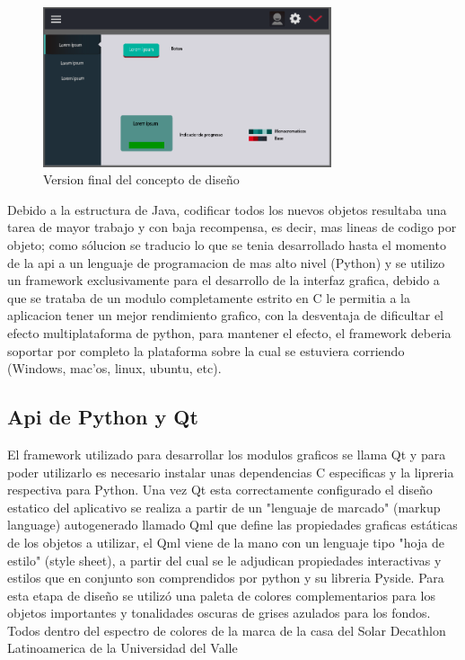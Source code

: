 \begin{figure}[htbp]
	\centerline{\includegraphics[width=8.5cm]{./figuras/house_manager_version_3.png}}
	\caption{Version final del concepto de diseño}
	\label{fig_22}
\end{figure}

Debido a la estructura de Java, codificar todos los nuevos objetos resultaba una tarea de mayor trabajo y con baja recompensa, es decir, mas lineas de codigo por objeto; como sólucion se traducio lo que se tenia desarrollado hasta el momento de la api a un lenguaje de programacion de mas alto nivel (Python) y se utilizo un framework exclusivamente para el desarrollo de la interfaz grafica, debido a que se trataba de un modulo completamente estrito en C le permitia a la aplicacion tener un mejor rendimiento grafico, con la desventaja de dificultar el efecto multiplataforma de python, para mantener el efecto, el framework deberia soportar por completo la plataforma sobre la cual se estuviera corriendo (Windows, mac'os, linux, ubuntu, etc).

\subsection{Api de Python y Qt}

El framework utilizado para desarrollar los modulos graficos se llama Qt y para poder utilizarlo es necesario instalar unas dependencias C especificas y la lipreria respectiva para Python. Una vez Qt esta correctamente configurado el diseño estatico del aplicativo se realiza a partir de un "lenguaje de marcado" (markup language) autogenerado llamado Qml que define las propiedades graficas estáticas de los objetos a utilizar, el Qml viene de la mano con un lenguaje tipo "hoja de estilo" (style sheet), a partir del cual se le adjudican propiedades interactivas y estilos que en conjunto son comprendidos por python y su libreria Pyside.
Para esta etapa de diseño se utilizó una paleta de colores complementarios para los objetos importantes y tonalidades oscuras de grises azulados para los fondos. Todos dentro del espectro de colores de la marca de la casa del Solar Decathlon Latinoamerica de la Universidad del Valle  


